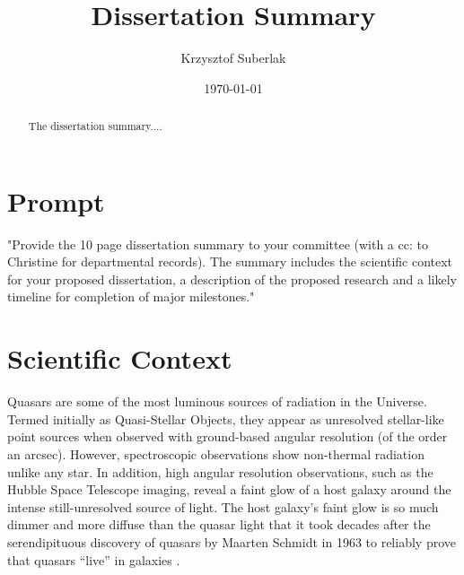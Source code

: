 \documentclass[modern]{aastex62}
\begin{document}
\title{Dissertation Summary}
\author{Krzysztof Suberlak}

\date{ \today
}

\begin{abstract}
The dissertation summary.... 
\end{abstract}

\section*{Prompt}
"Provide the 10 page dissertation summary to your committee (with a cc: to Christine for
departmental records). The summary includes the scientific context for your proposed
dissertation, a description of the proposed research and a likely timeline for completion of
major milestones."

\section{Scientific Context}

Quasars are some of the most luminous sources of radiation in the Universe.  Termed initially as Quasi-Stellar Objects, they appear as unresolved stellar-like point sources when observed with ground-based angular resolution (of the order an arcsec). However, spectroscopic observations show non-thermal radiation unlike any star. In addition, high angular resolution observations, such as the Hubble Space Telescope imaging, reveal a faint glow of a host galaxy around the intense still-unresolved source of light. The host galaxy's faint glow is so much dimmer and more diffuse than the quasar light that it took decades after the serendipituous discovery of quasars by Maarten Schmidt in 1963 \citep{schmidt1963, richards2009a} to reliably prove that quasars “live” in galaxies \citep{hooper1997, boyce1999, lehnert1999}.
\end{document}
